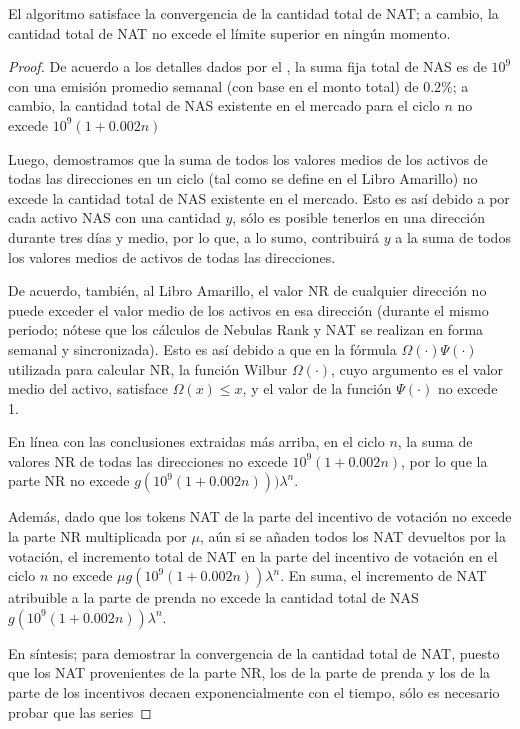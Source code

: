 \begin{property}
	El algoritmo satisface la convergencia de la cantidad total de NAT; a cambio, la cantidad total de NAT no excede el límite superior en ningún momento.
\end{property}

\begin{proof}
	De acuerdo a los detalles dados por el \techw, la suma fija total de NAS es de $10^9$ con una emisión promedio semanal (con base en el monto total) de $0.2\%$; a cambio, la cantidad total de NAS existente en el mercado para el ciclo $n$ no excede $10^9 (1+0.002n)$

	Luego, demostramos que la suma de todos los valores medios de los activos de todas las direcciones en un ciclo (tal como se define en el Libro Amarillo) no excede la cantidad total de NAS existente en el mercado. Esto es así debido a por cada activo NAS con una cantidad $y$, sólo es posible tenerlos en una dirección durante tres días y medio, por lo que, a lo sumo, contribuirá $y$ a la suma de todos los valores medios de activos de todas las direcciones.

	De acuerdo, también, al Libro Amarillo, el valor NR de cualquier dirección no puede exceder el valor medio de los activos en esa dirección (durante el mismo periodo; nótese que los cálculos de Nebulas Rank y NAT se realizan en forma semanal y sincronizada). Esto es así debido a que en la fórmula $\Omega(\cdot)\Psi(\cdot)$ utilizada para calcular NR, la función Wilbur $\Omega(\cdot)$, cuyo argumento es el valor medio del activo, satisface $\Omega (x) \leq x$, y el valor de la función $\Psi(\cdot)$ no excede 1.

	En línea con las conclusiones extraidas más arriba, en el ciclo $n$, la suma de valores NR de todas las direcciones no excede $10^9(1+0.002n)$, por lo que la parte NR no excede $g(10^9(1+0.002n)))\lambda^n$.

	Además, dado que los tokens NAT de la parte del incentivo de votación no excede la parte NR multiplicada por $\mu$, aún si se añaden todos los NAT devueltos por la votación, el incremento total de NAT en la parte del incentivo de votación en el ciclo $n$ no excede $\mu g(10^9( 1+0.002n))\lambda^n$. En suma, el incremento de NAT atribuible a la parte de prenda no excede la cantidad total de NAS $g (10^9(1+0.002n))\lambda^n$.

	En síntesis; para demostrar la convergencia de la cantidad total de NAT, puesto que los NAT provenientes de la parte NR, los de la parte de prenda y los de la parte de los incentivos decaen exponencialmente con el tiempo, sólo es necesario probar que las series


\end{proof}
